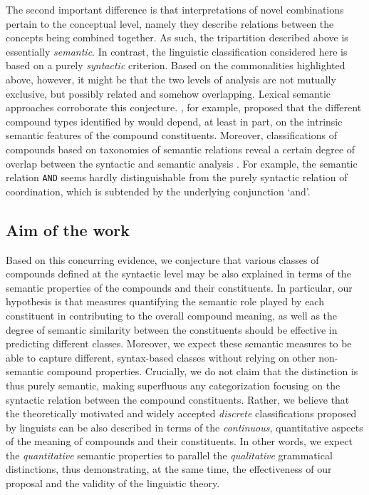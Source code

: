 \documentclass[output=paper]{langsci/langscibook}
\begin{document}
The second important difference is that interpretations of novel combinations pertain to the conceptual level, namely they describe relations between the concepts being combined together. As such, the tripartition described above is essentially \emph{semantic}. In contrast, the linguistic classification considered here is based on a purely \emph{syntactic} criterion. Based on the commonalities highlighted above, however, it might be that the two levels of analysis are not mutually exclusive, but possibly related and somehow overlapping. Lexical semantic approaches corroborate this conjecture. \cite{lieber5OHC}, for example, proposed that the different compound types identified by \cite{SB2005} would depend, at least in part, on the intrinsic semantic features of the compound constituents. Moreover, classifications of compounds based on taxonomies of semantic relations reveal a certain degree of overlap between the syntactic and semantic analysis \citep{levi1978}. For example, the semantic relation \texttt{AND} seems hardly distinguishable from the purely syntactic relation of coordination, which is subtended by the underlying conjunction `and'.

\subsection{Aim of the work}

Based on this concurring evidence, we conjecture that various classes of compounds defined at the syntactic level may be also explained in terms of the semantic properties of the compounds and their constituents. In particular, our hypothesis is that measures quantifying the semantic role played by each constituent in contributing to the overall compound meaning, as well as the degree of semantic similarity between the constituents should be effective in predicting different classes. Moreover, we expect these semantic measures to be able to capture different, syntax-based classes without relying on other non-semantic compound properties. Crucially, we do not claim that the distinction is thus purely semantic, making superfluous any categorization focusing on the syntactic relation between the compound constituents. Rather, we believe that the theoretically motivated and widely accepted \emph{discrete} classifications proposed by linguists can be also described in terms of the \emph{continuous}, quantitative aspects of the meaning of compounds and their constituents. In other words, we expect the \emph{quantitative} semantic properties to parallel the \emph{qualitative} grammatical distinctions, thus demonstrating, at the same time, the effectiveness of our proposal and the validity of the linguistic theory.
\end{document}

